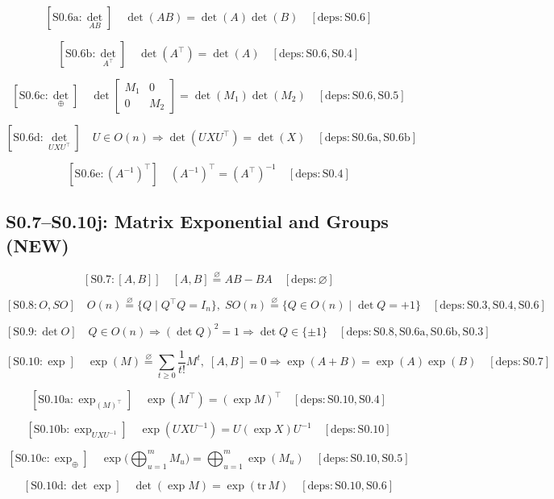 \documentclass[11pt]{article}
\newcommand{\eqdef}{\overset{\varnothing}{=}}
\newcommand{\deps}[1]{\quad[\mathrm{deps}:#1]}
\begin{document}
\[
\boxed{[\mathrm{S0}.6\mathrm{a}:\det_{AB}]}\quad
\det(AB) = \det(A)\det(B)
\deps{\mathrm{S0}.6}
\]

\[
\boxed{[\mathrm{S0}.6\mathrm{b}:\det_{A^\top}]}\quad
\det(A^\top) = \det(A)
\deps{\mathrm{S0}.6,\mathrm{S0}.4}
\]

\[
\boxed{[\mathrm{S0}.6\mathrm{c}:\det_{\oplus}]}\quad
\det\begin{bmatrix}M_1&0\\0&M_2\end{bmatrix} = \det(M_1)\det(M_2)
\deps{\mathrm{S0}.6,\mathrm{S0}.5}
\]

\[
\boxed{[\mathrm{S0}.6\mathrm{d}:\det_{UXU^\top}]}\quad
U\in O(n) \Rightarrow \det(UXU^\top) = \det(X)
\deps{\mathrm{S0}.6\mathrm{a},\mathrm{S0}.6\mathrm{b}}
\]

\[
\boxed{[\mathrm{S0}.6\mathrm{e}:(A^{-1})^\top]}\quad
(A^{-1})^\top = (A^\top)^{-1}
\deps{\mathrm{S0}.4}
\]

\subsection*{S0.7--S0.10j: Matrix Exponential and Groups (NEW)}

\[
\boxed{[\mathrm{S0}.7:[A,B]]}\quad
[A,B] \eqdef AB-BA
\deps{\varnothing}
\]

\[
\boxed{[\mathrm{S0}.8:O,SO]}\quad
O(n) \eqdef \{Q\mid Q^\top Q=I_n\},\;
SO(n) \eqdef \{Q\in O(n)\mid \det Q=+1\}
\deps{\mathrm{S0}.3,\mathrm{S0}.4,\mathrm{S0}.6}
\]

\[
\boxed{[\mathrm{S0}.9:\det O]}\quad
Q\in O(n) \Rightarrow (\det Q)^2=1 \Rightarrow \det Q\in\{\pm1\}
\deps{\mathrm{S0}.8,\mathrm{S0}.6\mathrm{a},\mathrm{S0}.6\mathrm{b},\mathrm{S0}.3}
\]

\[
\boxed{[\mathrm{S0}.10:\exp]}\quad
\exp(M) \eqdef \sum_{t\ge0}\frac{1}{t!}M^t,\;
[A,B]=0 \Rightarrow \exp(A+B)=\exp(A)\exp(B)
\deps{\mathrm{S0}.7}
\]

\[
\boxed{[\mathrm{S0}.10\mathrm{a}:\exp_{(M)^\top}]}\quad
\exp(M^\top) = (\exp M)^\top
\deps{\mathrm{S0}.10,\mathrm{S0}.4}
\]

\[
\boxed{[\mathrm{S0}.10\mathrm{b}:\exp_{UXU^{-1}}]}\quad
\exp(UXU^{-1}) = U(\exp X)U^{-1}
\deps{\mathrm{S0}.10}
\]

\[
\boxed{[\mathrm{S0}.10\mathrm{c}:\exp_{\oplus}]}\quad
\exp\Big(\bigoplus_{u=1}^m M_u\Big) = \bigoplus_{u=1}^m \exp(M_u)
\deps{\mathrm{S0}.10,\mathrm{S0}.5}
\]

\[
\boxed{[\mathrm{S0}.10\mathrm{d}:\det\exp]}\quad
\det(\exp M) = \exp(\mathrm{tr}\,M)
\deps{\mathrm{S0}.10,\mathrm{S0}.6}
\]
\end{document}
